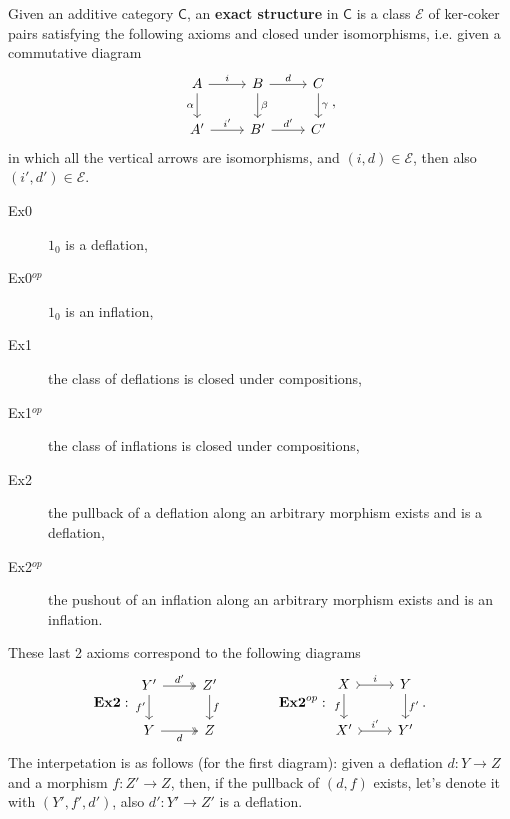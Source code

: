 \begin{defn}
	Given an additive category $\mathsf{C}$, an \textbf{exact structure} in $\mathsf{C}$ is a class $\mathcal{E}$ of ker-coker pairs satisfying the following axioms and closed under isomorphisms, i.e.
	given a commutative diagram
	\begin{equation}
	\begin{tikzcd}
		A \arrow[r, "i", rightarrow] \arrow[d, "\alpha"', rightarrow] &
		B \arrow[r, "d", rightarrow] \arrow[d, "\beta", rightarrow] &
		C \arrow[d, "\gamma", rightarrow] \\
		A' \arrow[r, "i'", rightarrow] &
		B' \arrow[r, "d'", rightarrow] &
		C'
	\end{tikzcd}
	,\end{equation} 
	in which all the vertical arrows are isomorphisms, and $\left(i, d\right) \in \mathcal{E}$, then also $\left(i', d'\right) \in \mathcal{E}$.
	\begin{description}
		\item[Ex0] $1_0$ is a deflation,
		\item[Ex0$^{op}$] $1_0$ is an inflation,
		\item[Ex1] the class of deflations is closed under compositions,
		\item[Ex1$^{op}$] the class of inflations is closed under compositions,
		\item[Ex2] the pullback of a deflation along an arbitrary morphism exists and is a deflation,
		\item[Ex2$^{op}$] the pushout of an inflation along an arbitrary morphism exists and is an inflation.
	\end{description} 
	These last 2 axioms correspond to the following diagrams
	\begin{equation}
	\mathbf{Ex2}:
	\begin{tikzcd}
		Y' \arrow[r, "d'", twoheadrightarrow] \arrow[d, "f'"', rightarrow] &
		Z' \arrow[d, "f", rightarrow] \\
		Y \arrow[r, "d"', twoheadrightarrow] &
		Z
	\end{tikzcd}\quad\quad\quad\quad
	\mathbf{Ex2}^{op}:
	\begin{tikzcd}
		X \arrow[r, "i", tail] \arrow[d, "f"', rightarrow] &
		Y \arrow[d, "f'", rightarrow] \\
		X' \arrow[r, "i'", tail] &
		Y'
	\end{tikzcd}
	.\end{equation} 
	The interpetation is as follows (for the first diagram):
	given a deflation $d: Y \to Z$ and a morphism $f: Z' \to Z$, then,
	if the pullback of $\left(d, f\right)$ exists, let's denote it with $\left(Y', f', d'\right)$, also $d': Y' \to Z'$ is a deflation.
\end{defn}

